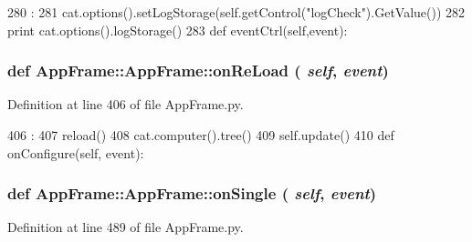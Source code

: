 \begin{DoxyCode}
280                                :
281         cat.options().setLogStorage(self.getControl("logCheck").GetValue())
282         print cat.options().logStorage()
283         
    def eventCtrl(self,event):
\end{DoxyCode}
\hypertarget{classAppFrame_1_1AppFrame_a245f8c716ec863af51493af54f2cd7c6}{
\subsubsection[{onReLoad}]{\setlength{\rightskip}{0pt plus 5cm}def AppFrame::AppFrame::onReLoad ( {\em self}, \/   {\em event})}}
\label{classAppFrame_1_1AppFrame_a245f8c716ec863af51493af54f2cd7c6}


Definition at line 406 of file AppFrame.py.


\begin{DoxyCode}
406                              :
407         reload()
408         cat.computer().tree()
409         self.update()
410 
    def onConfigure(self, event):
\end{DoxyCode}
\hypertarget{classAppFrame_1_1AppFrame_af7be990776d498b34f698dc9451b4883}{
\subsubsection[{onSingle}]{\setlength{\rightskip}{0pt plus 5cm}def AppFrame::AppFrame::onSingle ( {\em self}, \/   {\em event})}}
\label{classAppFrame_1_1AppFrame_af7be990776d498b34f698dc9451b4883}


Definition at line 489 of file AppFrame.py.


